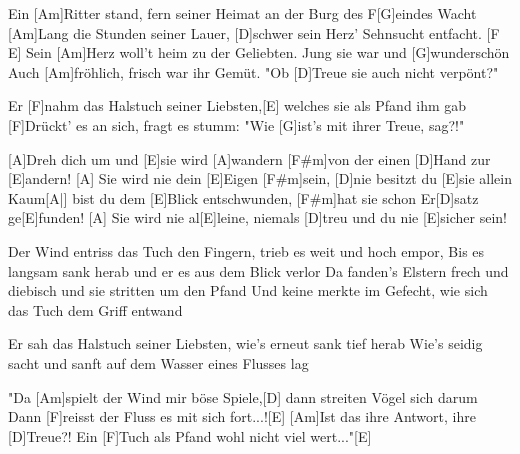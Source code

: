 

\begin{guitar}
	Ein [Am]Ritter stand, fern seiner Heimat an der Burg des F[G]eindes Wacht
	[Am]Lang die Stunden seiner Lauer, [D]schwer sein Herz' Sehnsucht entfacht. [F E]{}
	Sein [Am]Herz woll't heim zu der Geliebten. Jung sie war und [G]wunderschön
	Auch [Am]fröhlich, frisch war ihr Gemüt. "Ob [D]Treue sie auch nicht verpönt?"
	
	Er [F]nahm das Halstuch seiner Liebsten,[E] welches sie als Pfand ihm gab
	[F]Drückt' es an sich, fragt es stumm: "Wie [G]ist's mit ihrer Treue, sag?!"
	
	[A]Dreh dich um und [E]sie wird [A]wandern [F#m]von der einen [D]Hand zur [E]andern!
	[A] Sie wird nie dein [E]Eigen [F#m]sein, [D]nie besitzt du [E]sie allein
	Kaum[A|] bist du dem [E]Blick entschwunden, [F#m]hat sie schon Er[D]satz ge[E]funden!
	[A] Sie wird nie al[E]leine, niemals [D]treu und du nie [E]sicher sein!
	
	Der Wind entriss das Tuch den Fingern, trieb es weit und hoch empor,
	Bis es langsam sank herab und er es aus dem Blick verlor
	Da fanden's Elstern frech und diebisch und sie stritten um den Pfand
	Und keine merkte im Gefecht, wie sich das Tuch dem Griff entwand
	
	Er sah das Halstuch seiner Liebsten, wie's erneut sank tief herab
	Wie's seidig sacht und sanft auf dem Wasser eines Flusses lag
	
	 

	"Da [Am]spielt der Wind mir böse Spiele,[D] dann streiten Vögel sich darum
	Dann [F]reisst der Fluss es mit sich fort...![E]{}
	[Am]Ist das ihre Antwort, ihre [D]Treue?!
	Ein [F]Tuch als Pfand wohl nicht viel wert..."[E]{}
	
	 
\end{guitar}